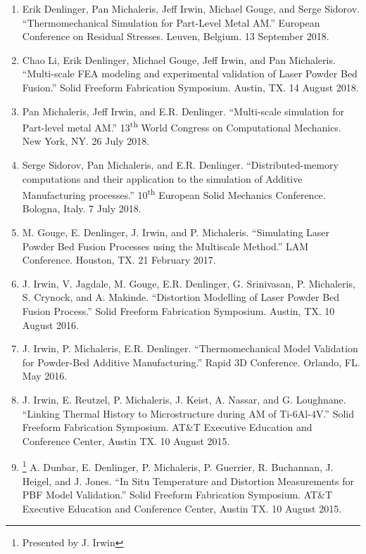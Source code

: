 \documentclass[10.5pt,letterpaper]{article}
\begin{document}
\begin{enumerate}[leftmargin=*]
	\setlength{\parskip}{0em}
	\item Erik Denlinger, Pan Michaleris, Jeff Irwin, Michael Gouge, and Serge Sidorov.  ``Thermomechanical Simulation for Part-Level Metal AM.''  European Conference on Residual Stresses.  Leuven, Belgium.  13 September 2018.
	\item Chao Li, Erik Denlinger, Michael Gouge, Jeff Irwin, and Pan Michaleris.  ``Multi-scale FEA modeling and experimental validation of Laser Powder Bed Fusion.'' Solid Freeform Fabrication Symposium.  Austin, TX. 14 August 2018.
	\item Pan Michaleris, Jeff Irwin, and E.R. Denlinger.  ``Multi-scale simulation for Part-level metal AM.''  13\textsuperscript{th} World Congress on Computational Mechanics.  New York, NY.  26 July 2018.
	\item Serge Sidorov, Pan Michaleris, and E.R. Denlinger.  ``Distributed-memory computations and their application to the simulation of Additive Manufacturing processes.''  10\textsuperscript{th} European Solid Mechanics Conference.  Bologna, Italy.  7 July 2018.
	\item M. Gouge, E. Denlinger, J. Irwin, and P. Michaleris.  ``Simulating Laser Powder Bed Fusion Processes using the Multiscale Method.''  LAM Conference.  Houston, TX.  21 February 2017.
	\item J. Irwin, V. Jagdale, M. Gouge, E.R. Denlinger, G. Srinivasan, P. Michaleris, S. Crynock, and A. Makinde.  ``Distortion Modelling of Laser Powder Bed Fusion Process.''  Solid Freeform Fabrication Symposium.  Austin, TX.  10 August 2016.
	\item J. Irwin, P. Michaleris, E.R. Denlinger.  ``Thermomechanical Model Validation for Powder-Bed Additive Manufacturing.''  Rapid 3D Conference.  Orlando, FL.  May 2016.
	\item J. Irwin, E. Reutzel, P. Michaleris, J. Keist, A. Nassar, and G. Loughnane. ``Linking Thermal History to Microstructure during AM of Ti-6Al-4V.'' Solid Freeform Fabrication Symposium. AT\&T Executive Education and Conference Center, Austin TX. 10 August 2015.
	\item \footnote{\label{note1}Presented by J. Irwin} A. Dunbar, E. Denlinger, P. Michaleris, P. Guerrier, R. Buchannan, J. Heigel, and J. Jones. ``In Situ Temperature and Distortion Measurements for PBF Model Validation.'' Solid Freeform Fabrication Symposium. AT\&T Executive Education and Conference Center, Austin TX. 10 August 2015.

\end{enumerate}
\end{document}
